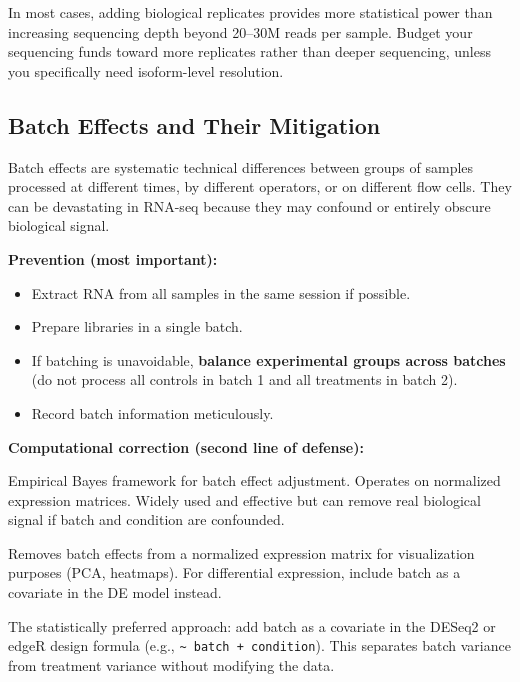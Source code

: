 \begin{tipbox}
In most cases, adding biological replicates provides more statistical power
than increasing sequencing depth beyond 20--30M reads per sample. Budget your
sequencing funds toward more replicates rather than deeper sequencing, unless
you specifically need isoform-level resolution.
\end{tipbox}

\subsection{Batch Effects and Their Mitigation}

Batch effects are systematic technical differences between groups of samples
processed at different times, by different operators, or on different flow
cells. They can be devastating in RNA-seq because they may confound or entirely
obscure biological signal.

\textbf{Prevention (most important):}
\begin{itemize}[nosep]
  \item Extract RNA from all samples in the same session if possible.
  \item Prepare libraries in a single batch.
  \item If batching is unavoidable, \textbf{balance experimental groups across
    batches} (do not process all controls in batch 1 and all treatments in
    batch 2).
  \item Record batch information meticulously.
\end{itemize}

\textbf{Computational correction (second line of defense):}
\begin{description}[style=nextline]
  \item[\software{ComBat} (sva package)] Empirical Bayes framework for batch
    effect adjustment. Operates on normalized expression matrices. Widely used
    and effective but can remove real biological signal if batch and condition
    are confounded.
  \item[\software{limma::removeBatchEffect}] Removes batch effects from a
    normalized expression matrix for visualization purposes (PCA, heatmaps).
    For differential expression, include batch as a covariate in the DE model
    instead.
  \item[Inclusion in the DE model] The statistically preferred approach: add
    batch as a covariate in the DESeq2 or edgeR design formula (e.g.,
    \texttt{\textasciitilde{} batch + condition}). This separates batch
    variance from treatment variance without modifying the data.
\end{description}

